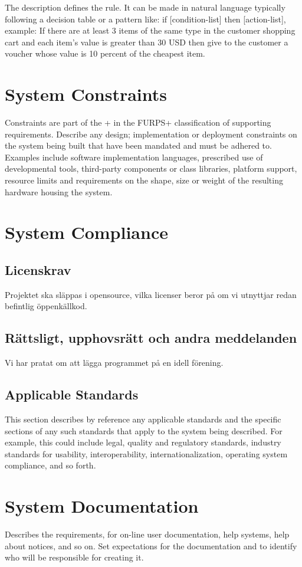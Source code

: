 The description defines the rule. It can be made in natural language typically following a decision table or a pattern like:  if [condition-list] then [action-list], example: 
If there are at least 3 items of the same type in the customer shopping cart and each item’s value is greater than 30 USD then give to the customer a voucher whose value is 10 percent of the cheapest item.


\section{System Constraints}

Constraints are part of the + in the FURPS+ classification of supporting requirements. Describe any design; implementation or deployment constraints on the system being built that have been mandated and must be adhered to. Examples include software implementation languages, prescribed use of developmental tools, third-party components or class libraries, platform support, resource limits and requirements on the shape, size or weight of the resulting hardware housing the system.

\section{System Compliance}

\subsection{Licenskrav}
Projektet ska släppas i opensource, vilka licenser beror på om vi utnyttjar redan befintlig öppenkällkod. 

\subsection{Rättsligt, upphovsrätt och andra meddelanden}
Vi har pratat om att lägga programmet på en idell förening. 

\subsection{Applicable Standards}

This section describes by reference any applicable standards and the specific sections of any such standards that apply to the system being described. For example, this could include legal, quality and regulatory standards, industry standards for usability, interoperability, internationalization, operating system compliance, and so forth.

\section{System Documentation}

Describes the requirements, for on-line user documentation, help systems, help about notices, and so on. Set expectations for the documentation and to identify who will be responsible for creating it.


